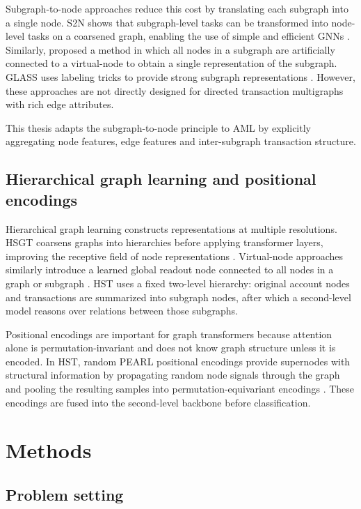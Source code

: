 \documentclass[12pt, twocolumn]{report}
\begin{document}
Subgraph-to-node approaches reduce this cost by translating each subgraph into a single node. S2N shows that subgraph-level tasks can be transformed into node-level tasks on a coarsened graph, enabling the use of simple and efficient GNNs \cite{kim2024translating}. Similarly, \citep{2017supernode} proposed a method in which all nodes in a subgraph are artificially connected to a virtual-node to obtain a single representation of the subgraph. GLASS uses labeling tricks to provide strong subgraph representations \cite{glass2022}. However, these approaches are not directly designed for directed transaction multigraphs with rich edge attributes. 

This thesis adapts the subgraph-to-node principle to AML by explicitly aggregating node features, edge features and inter-subgraph transaction structure.

\section{Hierarchical graph learning and positional encodings}

Hierarchical graph learning constructs representations at multiple resolutions. HSGT coarsens graphs into hierarchies before applying transformer layers, improving the receptive field of node representations \cite{zhu2023hierarchicaltransformerscalablegraph}. Virtual-node approaches similarly introduce a learned global readout node connected to all nodes in a graph or subgraph \cite{2017supernode}. HST uses a fixed two-level hierarchy: original account nodes and transactions are summarized into subgraph nodes, after which a second-level model reasons over relations between those subgraphs.

Positional encodings are important for graph transformers because attention alone is permutation-invariant and does not know graph structure unless it is encoded. In HST, random PEARL positional encodings provide supernodes with structural information by propagating random node signals through the graph and pooling the resulting samples into permutation-equivariant encodings \cite{pearlencodings}. These encodings are fused into the second-level backbone before classification.

\chapter{Methods}
\label{chap:methods}

\section{Problem setting}
\end{document}
